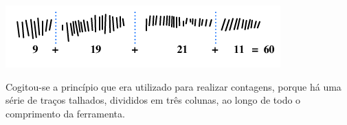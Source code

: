 \begin{multicols}{2}
\begin{center}
	\includegraphics[width=\linewidth]{./IMG/IshangoColumnC.png}
\end{center}

\vfill
\columnbreak

	{\large Cogitou-se a princípio que era utilizado para realizar contagens, porque há uma série de traços talhados, divididos em três colunas, ao longo de todo o comprimento da ferramenta.}


\vfill\null
\pagebreak
\end{multicols}


